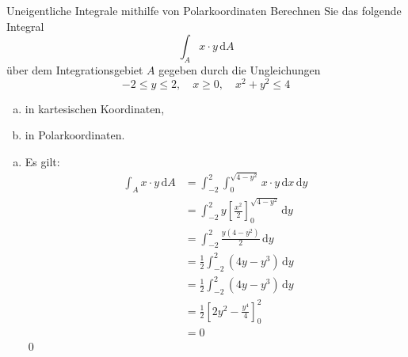 \documentclass[german]{../spicker}
\renewcommand{\d}{\,\mathrm{d}}
\begin{document}
\begin{example}{Uneigentliche Integrale mithilfe von Polarkoordinaten}
    Berechnen Sie das folgende Integral
    $$
        \int_A x\cdot y \d A
    $$
    über dem Integrationsgebiet $A$ gegeben durch die Ungleichungen
    $$
        -2 \leq y \leq 2, \quad x \geq 0, \quad x^2 + y^2 \leq 4
    $$
    \begin{enumerate}[(a)]
        \item in kartesischen Koordinaten,
        \item in Polarkoordinaten.
    \end{enumerate}

    \noindent\makebox[\linewidth]{\rule{\textwidth}{1pt}}

    \begin{enumerate}[(a)]
        \item
              Es gilt:
              $$
                  \begin{aligned}
                      \int_A x\cdot y \d A & = \int_{-2}^2 \int^{\sqrt{4-y^2}}_0 x\cdot y \d x \d y             \\
                                           & = \int_{-2}^2 y \left[ \frac{x^2}{2} \right]^{\sqrt{4-y^2}}_0 \d y \\
                                           & = \int_{-2}^2 \frac{y(4-y^2)}{2} \d y                              \\
                                           & = \frac{1}{2}\int_{-2}^2 (4y-y^3) \d y                             \\
                                           & = \frac{1}{2}\int_{-2}^2 (4y-y^3) \d y                             \\
                                           & = \frac{1}{2}\left[2y^2-\frac{y^4}{4}\right]_{0}^2                 \\
                                           & = 0
                  \end{aligned}
              $$\qed
    \end{enumerate}
\end{example}
\end{document}
